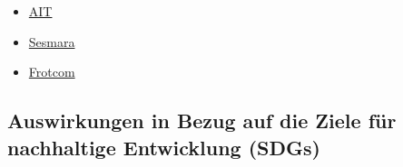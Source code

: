 \documentclass[
]{book}
\providecommand{\tightlist}{%
  \setlength{\itemsep}{0pt}\setlength{\parskip}{0pt}}
\begin{document}
\begin{itemize}
\tightlist
\item
  \href{https://www.ait.ac.at/en/solutions/plan}{AIT}
\item
  \href{https://www.samsara.com/at/}{Sesmara}
\item
  \href{https://www.frotcom.com/de}{Frotcom}
\end{itemize}

\hypertarget{auswirkungen-in-bezug-auf-die-ziele-fuxfcr-nachhaltige-entwicklung-sdgs-16}{%
\subsection*{Auswirkungen in Bezug auf die Ziele für nachhaltige Entwicklung (SDGs)}\label{auswirkungen-in-bezug-auf-die-ziele-fuxfcr-nachhaltige-entwicklung-sdgs-16}}
\end{document}
